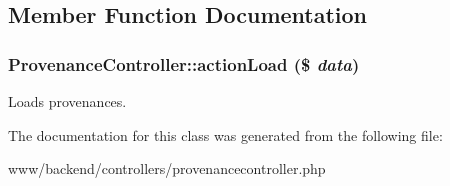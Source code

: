 \subsection{Member Function Documentation}
\hypertarget{classProvenanceController_ad2de41e8a7cb3d641ec6fe6ecfc52278}{
\subsubsection[{actionLoad}]{\setlength{\rightskip}{0pt plus 5cm}ProvenanceController::actionLoad (\$ {\em data})}}
\label{classProvenanceController_ad2de41e8a7cb3d641ec6fe6ecfc52278}
Loads provenances. 

The documentation for this class was generated from the following file:\begin{DoxyCompactItemize}
\item 
www/backend/controllers/provenancecontroller.php\end{DoxyCompactItemize}
